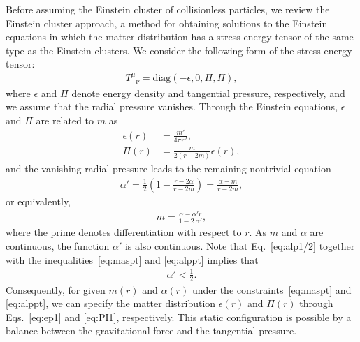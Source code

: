 \documentclass[aps,11pt,nofootinbib,preprintnumbers,groupedaddress,superscriptaddress]{revtex4-2}
\begin{document}
Before assuming the Einstein cluster of collisionless particles, we review the Einstein cluster approach, 
a method for obtaining solutions to the Einstein equations in which the matter distribution 
has a stress-energy tensor of the same type as the Einstein clusters. 
We consider the following form of the stress-energy tensor:
\begin{align}
\label{eq:Tmunu}
T^{\mu}{}_{\nu}=\mathrm{diag} (-\epsilon, 0, \Pi, \Pi),
\end{align}
where $\epsilon$ and $\Pi$ denote energy density and tangential pressure, respectively, and we assume that the radial pressure vanishes. 
Through the Einstein equations, $\epsilon$ and $\Pi$ are related to $m$ as 
\begin{align}
\label{eq:ep1}
\epsilon(r)&=\frac{m'}{4\pi r^2},
\\
\label{eq:PI1}
\Pi(r)&=\frac{m}{2(r-2m)} \epsilon(r),
\end{align}
and the vanishing radial pressure leads to the remaining nontrivial equation 
\begin{align}
\label{eq:alp1/2}
\alpha'=\frac{1}{2}\left(
1-\frac{r-2\alpha}{r-2m}
\right)
=\frac{\alpha-m}{r-2m},
\end{align}
or equivalently,
\begin{align}
\label{eq:malpha}
m=\frac{\alpha-\alpha' r}{1-2\:\!\alpha'},
\end{align}
where the prime denotes differentiation with respect to $r$.
As $m$ and $\alpha$ are continuous, the function $\alpha'$ is also continuous. 
Note that Eq.~\eqref{eq:alp1/2} together with the inequalities~\eqref{eq:maspt} and \eqref{eq:alppt} implies that 
\begin{align}
\label{eq:haltalp}
\alpha'<\frac{1}{2}. 
\end{align}
Consequently, for given $m(r)$ and $\alpha(r)$ 
under the constraints~\eqref{eq:maspt} and \eqref{eq:alppt},
we can specify the matter distribution $\epsilon(r)$ and $\Pi(r)$ through Eqs.~\eqref{eq:ep1} and \eqref{eq:PI1}, respectively. 
This static configuration is possible by a balance between the gravitational force and the tangential pressure.
\end{document}
